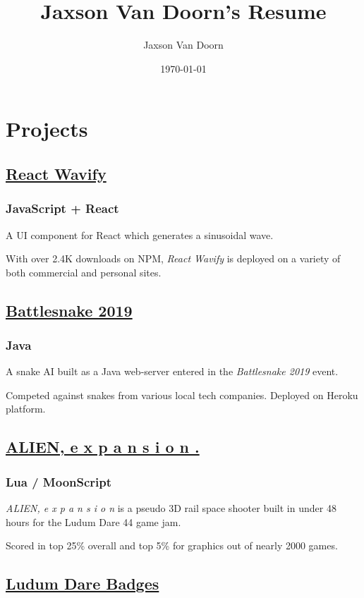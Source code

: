 \documentclass[letterpaper]{article}
\author{Jaxson Van Doorn}
\date{\today}
\title{Jaxson Van Doorn's Resume}
\begin{document}
 
\section{Projects}
\label{sec:orgfe8d6d7}
\subsection{\href{https://github.com/woofers/react-wavify}{React Wavify}}
\label{sec:orgc0f525b}
\subsubsection{JavaScript + React}
\label{sec:org24c21a1}
A UI component for React which generates a sinusoidal wave.

With over 2.4K downloads on NPM, \emph{React Wavify} is deployed on a variety of both commercial and personal sites.
\subsection{\href{https://github.com/woofers/battlesnake-2019}{Battlesnake 2019}}
\label{sec:org1d41d65}
\subsubsection{Java}
\label{sec:orgf1f8490}
A snake AI built as a Java web-server entered in the \emph{Battlesnake 2019} event.

Competed against snakes from various local tech companies.  Deployed on Heroku platform.

\subsection{\href{https://github.com/woofers/ludum-dare-44}{ALIEN, e x p a n s i o n .}}
\label{sec:orgc2c7950}
\subsubsection{Lua / MoonScript}
\label{sec:orge4321ad}
\emph{ALIEN, e x p a n s i o n} is a pseudo 3D rail space shooter built in under 48 hours for the Ludum Dare 44 game jam.

Scored in top 25\% overall and top 5\% for graphics out of nearly 2000 games.

\subsection{\href{https://github.com/woofers/ludum-dare-badges}{Ludum Dare Badges}}
\label{sec:orga1c5395}
\end{document}
